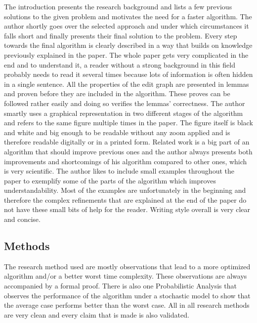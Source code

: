 \documentclass{scrartcl}[11pt]
\begin{document}
The introduction presents the research background and lists a few
previous solutions to the given problem and motivates the need for a
faster algorithm. The author shortly goes over the selected approach and
under which circumstances it falls short and finally presents their
final solution to the problem. Every step towards the final algorithm is
clearly described in a way that builds on knowledge previously explained
in the paper. The whole paper gets very complicated in the end and to
understand it, a reader without a strong background in this field probably
needs to read it several times because lots of information is often
hidden in a single sentence. All the properties of the edit graph are
presented in lemmas and proven before they are included in the
algorithm. These proves can be followed rather easily and doing so
verifies the lemmas' correctness. The author smartly uses a graphical
representation in two different stages of the algorithm and refers to
the same figure multiple times in the paper. The figure itself is black
and white and big enough to be readable without any zoom applied and is
therefore readable digitally or in a printed form. Related work is a big
part of an algorithm that should improve previous ones and the author
always presents both improvements and shortcomings of his algorithm
compared to other ones, which is very scientific. The author likes to
include small examples throughout the paper to exemplify some of the
parts of the algorithm which improves understandability. Most of the
examples are unfortunately in the beginning and therefore the complex
refinements that are explained at the end of the paper do not have these
small bits of help for the reader. 
Writing style overall is very clear
and concise.

\subsection{Methods}
The research method used are mostly observations that lead to a more optimized algorithm and/or a better worst time complexity. These observations are always accompanied by a formal proof.
There is also one Probabilistic Analysis that observes the performance of the algorithm under a stochastic model to show that the average case performs better than the worst case.
All in all research methods are very clean and every claim that is made is also validated.
\end{document}

